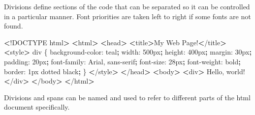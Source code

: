 \documentclass[]{book}
\newenvironment{Shaded}{\begin{snugshade}}{\end{snugshade}}
\newcommand{\ExtensionTok}[1]{#1}
\newcommand{\FunctionTok}[1]{\textcolor[rgb]{0.00,0.00,0.00}{#1}}
\newcommand{\KeywordTok}[1]{\textcolor[rgb]{0.13,0.29,0.53}{\textbf{#1}}}
\newcommand{\NormalTok}[1]{#1}
\newcommand{\OperatorTok}[1]{\textcolor[rgb]{0.81,0.36,0.00}{\textbf{#1}}}
\begin{document}
Divisions define sections of the code that can be separated so it can be controlled in a particular manner.
Font priorities are taken left to right if some fonts are not found.

\begin{Shaded}
\begin{Highlighting}[]
\OperatorTok{<}\NormalTok{!}\ExtensionTok{DOCTYPE}\NormalTok{ html}\OperatorTok{>}                        
\OperatorTok{<}\ExtensionTok{html}\OperatorTok{>}                                 
    \OperatorTok{<}\FunctionTok{head}\OperatorTok{>}                             
        \OperatorTok{<}\ExtensionTok{title}\OperatorTok{>}\NormalTok{My Web Page!}\OperatorTok{<}\NormalTok{/title}\OperatorTok{>}    
        \OperatorTok{<}\ExtensionTok{style}\OperatorTok{>}                        
            \ExtensionTok{div}\NormalTok{ \{                      }
                \ExtensionTok{background-color}\NormalTok{: teal}\KeywordTok{;}
                \ExtensionTok{width}\NormalTok{: 500px}\KeywordTok{;}          
                \ExtensionTok{height}\NormalTok{: 400px}\KeywordTok{;}         
                \ExtensionTok{margin}\NormalTok{: 30px}\KeywordTok{;}
                \ExtensionTok{padding}\NormalTok{: 20px}\KeywordTok{;}
                \ExtensionTok{font-family}\NormalTok{: Arial, sans-serif}\KeywordTok{;}
                \ExtensionTok{font-size}\NormalTok{: 28px}\KeywordTok{;}               
                \ExtensionTok{font-weight}\NormalTok{: bold}\KeywordTok{;}             
                \ExtensionTok{border}\NormalTok{: 1px dotted black}\KeywordTok{;}
\NormalTok{            \}                          }
        \OperatorTok{<}\NormalTok{/}\ExtensionTok{style}\OperatorTok{>}                       
    \OperatorTok{<}\NormalTok{/}\ExtensionTok{head}\OperatorTok{>}                            
    \OperatorTok{<}\ExtensionTok{body}\OperatorTok{>}                             
        \OperatorTok{<}\ExtensionTok{div}\OperatorTok{>}                          
            \ExtensionTok{Hello}\NormalTok{, world!              }
        \OperatorTok{<}\NormalTok{/}\ExtensionTok{div}\OperatorTok{>}                         
    \OperatorTok{<}\NormalTok{/}\ExtensionTok{body}\OperatorTok{>}                            
\OperatorTok{<}\NormalTok{/}\ExtensionTok{html}\OperatorTok{>}                                
\end{Highlighting}
\end{Shaded}

Divisions and spans can be named and used to refer to different parts of the html document specifically.
\end{document}
